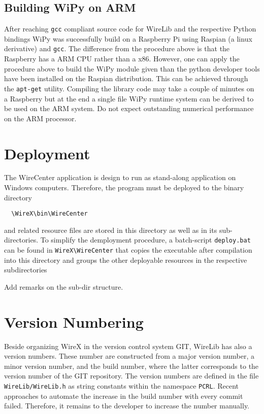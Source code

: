 \documentclass[11pt,a4paper,onepage,openany]{book}
\begin{document}
\subsection{Building WiPy on ARM}
After reaching \texttt{gcc} compliant source code for WireLib and the
respective Python bindings WiPy was successfully build on a Raspberry Pi using
Raspian (a linux derivative) and \texttt{gcc}. The difference from the procedure
above is that the Raspberry has a ARM CPU rather than a x86. However, one can
apply the procedure above to build the WiPy module given than the python
developer tools have been installed on the Raspian distribution. This can be
achieved through the \texttt{apt-get} utility. Compiling the library code may
take a couple of minutes on a Raspberry but at the end a single file WiPy
runtime system can be derived to be used on the ARM system. Do not expect
outstanding numerical performance on the ARM processor.

\section{Deployment}
The WireCenter application is design to run as stand-along application on
Windows computers. Therefore, the program must be deployed to the binary directory
\begin{verbatim}
  \WireX\bin\WireCenter
\end{verbatim}
and related resource files are stored in this directory as well as in its
sub-directories. To simplify the demployment procedure, a batch-script
\texttt{deploy.bat} can be found in \verb"WireX\WireCenter"
that copies the executable after compilation into this directory and groups
the other deployable resources in the respective subdirectories

Add remarks on the sub-dir structure.

\section{Version Numbering}
Beside organizing WireX in the version control system GIT, WireLib has also a
version
numbers. These number are constructed from a major version number, a minor
version number, and the build number, where the latter corresponds to the
version number of the GIT repository. The version numbers are defined in the
file \texttt{WireLib/WireLib.h} as string constants within the namespace
\texttt{PCRL}. Recent approaches to automate the increase in the build number
with every commit failed. Therefore, it remains to the developer to increase
the number manually.
\end{document}
